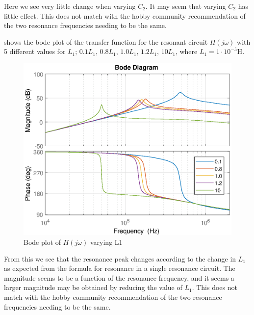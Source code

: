 Here we see very little change when varying $C_2$. It may seem that varying $C_2$ has little effect. This does not match with the hobby community recommendation of the two resonance frequencies needing to be the same.

\newpage
{} shows the bode plot of the transfer function for the resonant circuit $H(j\omega)$ with 5 different values for $L_1$; $0.1 L_1$, $0.8 L_1$, $1.0 L_1$, $1.2 L_1$, $10 L_1$, where $L_1 = 1 \cdot 10^{-5}$H.

\begin{figure}[H]
    \centering
    \includegraphics[width=\textwidth]{img/CoilRigBode_L1.eps}
    \caption{Bode plot of $H(j\omega)$ varying L1}
    \label{fig:bode_l1}
\end{figure}

From this we see that the resonance peak changes according to the change in $L_1$ as expected from the formula for resonance in a single resonance circuit. The magnitude seems to be a function of the resonance frequency, and it seems a larger magnitude may be obtained by reducing the value of $L_1$. This does not match with the hobby community recommendation of the two resonance frequencies needing to be the same.

